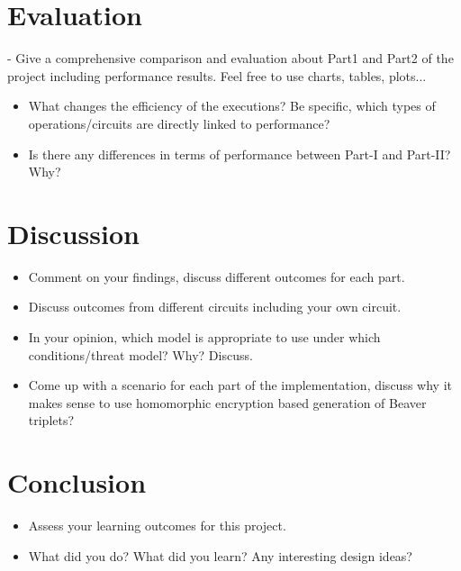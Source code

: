 \documentclass[10pt,conference,compsocconf]{IEEEtran}
\begin{document}
\section{Evaluation}
- Give a comprehensive comparison and evaluation about Part1 and Part2 of the project including performance results. Feel free to use charts, tables, plots...\\
\begin{itemize}
    \item What changes the efficiency of the executions? Be specific, which types of operations/circuits are directly linked to performance?
    \item Is there any differences in terms of performance between Part-I and Part-II? Why? 
\end{itemize}

\section{Discussion}
\begin{itemize}
    \item Comment on your findings, discuss different outcomes for each part.
    \item Discuss outcomes from different circuits including your own circuit.
    \item In your opinion, which model is appropriate to use under which conditions/threat model? Why? Discuss.
    \item Come up with a scenario for each part of the implementation, discuss why it makes sense to use homomorphic encryption based generation of Beaver triplets?
\end{itemize}

\section{Conclusion}
\begin{itemize}
    \item Assess your learning outcomes for this project.
    \item What did you do? What did you learn? Any interesting design ideas? 
\end{itemize}



\end{document}
